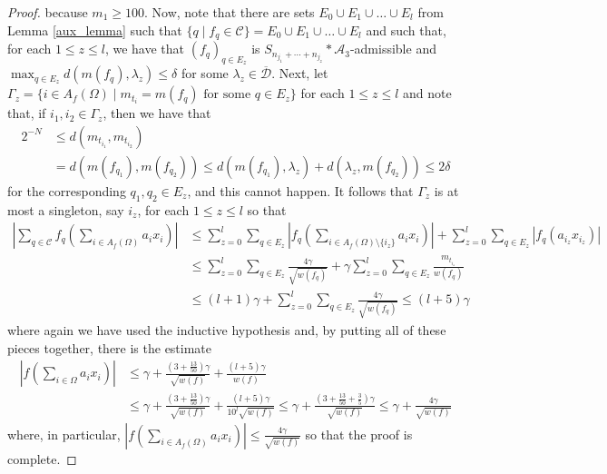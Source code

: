 \documentclass[12pt,a4paper]{amsart}
\theoremstyle{definition}
\theoremstyle{plain}
\begin{document}
\begin{proof}
because $m_{1}\geq 100$. Now, note that there are sets $E_{0}\cup E_{1}\cup\ldots\cup E_{l}$ from Lemma \ref{aux_lemma} such that $\{q \mid f_{q}\in \mathcal{C}\}=E_{0}\cup E_{1}\cup\ldots\cup E_{l}$ and such that, for each $1\leq z\leq l$, we have that $(f_{q})_{q\in E_{z}}$ is $S_{n_{j_{1}}+\cdots+n_{j_{z}}}\ast\mathcal{A}_{3}$-admissible and $\max_{q\in E_{z}}d(m(f_{q}),\lambda_{z})\leq\delta$ for some $\lambda_{z}\in\overline{\mathcal{D}}$. Next, let $\Gamma_{z}=\{ i\in A_{f}(\Omega) \mid m_{t_{i}}=m(f_{q}) \text{ for some } q\in E_{z}\}$ for each $1\leq z\leq l$ and note that, if $i_{1},i_{2}\in \Gamma_{z}$, then we have that
\begin{align*} 2^{-N} &\leq d(m_{t_{i_{1}}},m_{t_{i_{2}}}) \\ &= d(m(f_{q_{1}}),m(f_{q_{2}}))\leq d(m(f_{q_{1}}),\lambda_{z})+d(\lambda_{z},m(f_{q_{2}})) \leq 2\delta \end{align*}
for the corresponding $q_{1},q_{2}\in E_{z}$, and this cannot happen. It follows that $\Gamma_{z}$ is at most a singleton, say $i_{z}$, for each $1\leq z\leq l$ so that
\begin{align*}\left\vert \sum_{q\in\mathcal{C}}f_{q}\left(\sum_{i\in A_{f}(\Omega)}a_{i}x_{i}\right)\right\vert &\leq \sum_{z=0}^{l} \sum_{q\in E_{z}} \left\vert f_{q}\left(\sum_{i \in A_{f}(\Omega)\setminus\{i_{z}\}}a_{i}x_{i}\right)\right\vert + \sum_{z=0}^{l}\sum_{q\in E_{z}}|f_{q}(a_{i_{z}}x_{i_{z}})| \\ &\leq \sum_{z=0}^{l}\sum_{q\in E_{z}}\frac{4\gamma}{\sqrt{w(f_{q})}} + \gamma\sum_{z=0}^{l}\sum_{q\in E_{z}}\frac{m_{t_{i_{z}}}}{w(f_{q})} \\ &\leq (l+1)\gamma + \sum_{z=0}^{l}\sum_{q\in E_{z}}\frac{4\gamma}{\sqrt{w(f_{q})}} \leq (l+5)\gamma  \end{align*}
where again we have used the inductive hypothesis and, by putting all of these pieces together, there is the estimate
\begin{align*} \left\vert f\left(\sum_{i\in\Omega}a_{i}x_{i}\right)\right\vert &\leq \gamma+\frac{(3+\frac{13}{50})\gamma}{\sqrt{w(f)}}+\frac{(l+5)\gamma}{w(f)} \\ &\leq \gamma+\frac{(3+\frac{13}{50})\gamma}{\sqrt{w(f)}}+\frac{(l+5)\gamma}{10^{l}\sqrt{w(f)}} \leq \gamma + \frac{(3+\frac{13}{50}+\frac{3}{5})\gamma}{\sqrt{w(f)}} \leq \gamma+ \frac{4\gamma}{\sqrt{w(f)}}\end{align*}
where, in particular, $\left\vert f\left(\sum_{i\in A_{f}(\Omega)}a_{i}x_{i}\right)\right\vert\leq \frac{4\gamma}{\sqrt{w(f)}} $ so that the proof is complete.
\end{proof}
\end{document}
